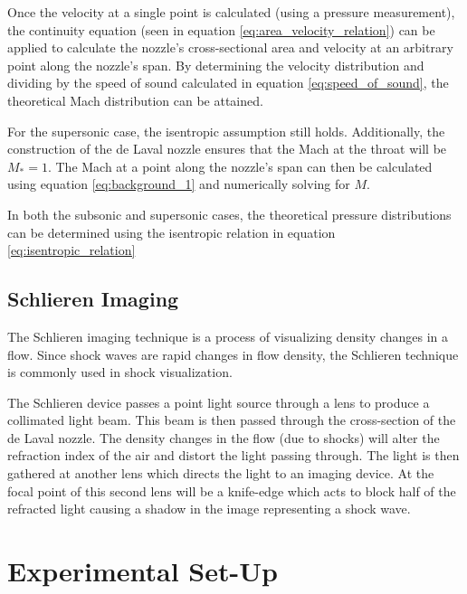 \documentclass[runningheads]{llncs}
\begin{document}
\noindent
Once the velocity at a single point is calculated (using a pressure measurement), the continuity equation (seen in equation \ref{eq:area_velocity_relation}) can be applied to calculate the nozzle's cross-sectional area and velocity at an arbitrary point along the nozzle's span. By determining the velocity distribution and dividing by the speed of sound calculated in equation \ref{eq:speed_of_sound}, the theoretical Mach distribution can be attained.

\noindent
For the supersonic case, the isentropic assumption still holds. Additionally, the construction of the de Laval nozzle ensures that the Mach at the throat will be $M_*=1$. The Mach at a point along the nozzle's span can then be calculated using equation \ref{eq:background_1} and numerically solving for $M$.\newline

\noindent
In both the subsonic and supersonic cases, the theoretical pressure distributions can be determined using the isentropic relation in equation \ref{eq:isentropic_relation}

\subsection{Schlieren Imaging}

The Schlieren imaging technique is a process of visualizing density changes in a flow. Since shock waves are rapid changes in flow density, the Schlieren technique is commonly used in shock visualization.\newline

\noindent
The Schlieren device passes a point light source through a lens to produce a collimated light beam. This beam is then passed through the cross-section of the de Laval nozzle. The density changes in the flow (due to shocks) will alter the refraction index of the air and distort the light passing through. The light is then gathered at another lens which directs the light to an imaging device. At the focal point of this second lens will be a knife-edge which acts to block half of the refracted light causing a shadow in the image representing a shock wave.




\section{Experimental Set-Up}
\end{document}
